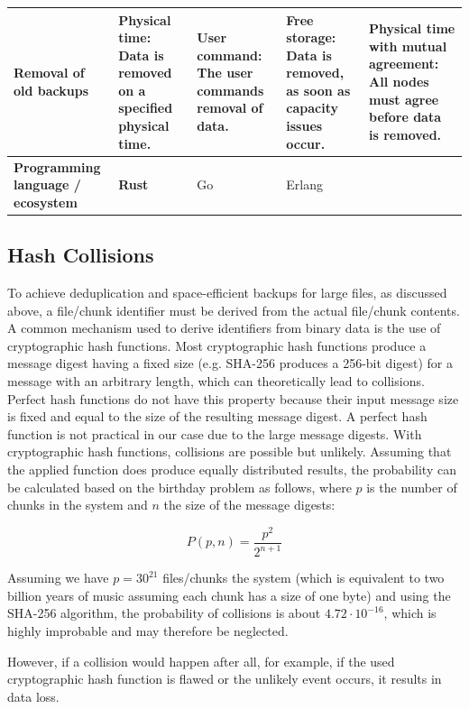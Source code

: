 \begin{table}
\begin{tabu}{X | X X X X}
          \textbf{Removal of old backups}
          & \textbf{Physical time}: Data is removed on a specified physical time.
          & User command: The user commands removal of data.
          & Free storage: Data is removed, as soon as capacity issues occur.
          & Physical time with mutual agreement: All \glspl{node} must agree before data is removed.
          \\ \hline


          \textbf{Programming language / ecosystem}
          & \textbf{Rust}
          & Go
          & Erlang
          & 
          \\ \hline
	\end{tabu}
\end{table}

\subsection{Hash Collisions}\label{sec:hash-collisions}
To achieve deduplication and space-efficient backups for large files, as discussed above, a file/chunk identifier must be derived from the actual file/chunk contents. 
A common mechanism used to derive identifiers from binary data is the use of cryptographic hash functions. Most cryptographic hash functions produce a message digest having a fixed size (e.g. SHA-256\cite{sha-256} produces a 256-bit digest) for a message with an arbitrary length, which can theoretically lead to collisions.
Perfect hash functions do not have this property because their input message size is fixed and equal to the size of the resulting message digest. A perfect hash function is not practical in our case due to the large message digests.
With cryptographic hash functions, collisions are possible but unlikely. Assuming that the applied function does produce equally distributed results, the probability can be calculated based on the birthday problem\cite{birthday-attack} as follows, where $p$ is the number of chunks in the system and $n$ the size of the message digests:

\[
P(p, n) = \frac{p^2}{2^{n+1}}
\]

Assuming we have $p=30^{21}$ files/chunks the system (which is equivalent to two billion years of music assuming each chunk has a size of one byte\cite{seagate-zetabyte}) and using the SHA-256 algorithm, the probability of collisions is about $4.72 \cdot 10^{-16}$, which is highly improbable and may therefore be neglected.

However, if a collision would happen after all, for example, if the used cryptographic hash function is flawed or the unlikely event occurs, it results in data loss.

